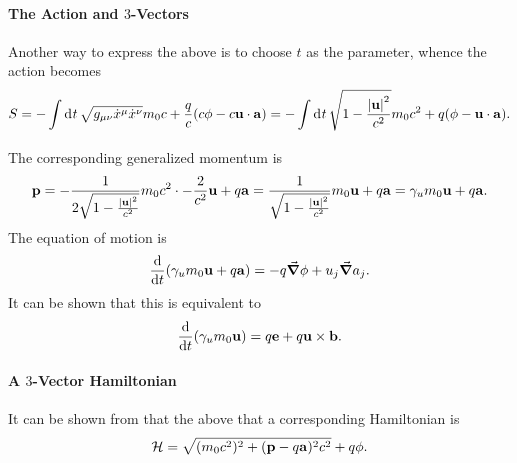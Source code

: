 \paragraph{The Action and $3$-Vectors}
Another way to express the above is to choose $t$ as the parameter, whence the action becomes
\begin{align*}
	S = -\int\limits_{}^{}\dd[]{t}\sqrt{g_{\mu\nu}\dot{x}^{\mu}\dot{x}^{\nu}}m_{0}c + \frac{q}{c}(c\phi - c\vb{u}\cdot\vb{a}) = -\int\limits_{}^{}\dd[]{t}\sqrt{1 - \frac{\abs{\vb{u}}^{2}}{c^{2}}}m_{0}c^{2} + q(\phi - \vb{u}\cdot\vb{a}).
\end{align*}
The corresponding generalized momentum is
\begin{align*}
	\vb{p} = -\frac{1}{2\sqrt{1 - \frac{\abs{\vb{u}}^{2}}{c^{2}}}}m_{0}c^{2}\cdot -\frac{2}{c^{2}}\vb{u} + q\vb{a} = \frac{1}{\sqrt{1 - \frac{\abs{\vb{u}}^{2}}{c^{2}}}}m_{0}\vb{u} + q\vb{a} = \gamma_{u}m_{0}\vb{u} + q\vb{a}.
\end{align*}
The equation of motion is
\begin{align*}
	\dv{t}(\gamma_{u}m_{0}\vb{u} + q\vb{a}) = -q\grad{\phi} + u_{j}\grad{a_{j}}.
\end{align*}
It can be shown that this is equivalent to
\begin{align*}
	\dv{t}(\gamma_{u}m_{0}\vb{u}) = q\vb{e} + q\vb{u}\times\vb{b}.
\end{align*}

\paragraph{A $3$-Vector Hamiltonian}
It can be shown from that the above that a corresponding Hamiltonian is
\begin{align*}
	\mathcal{H} = \sqrt{(m_{0}c^{2})^{2} + (\vb{p} - q\vb{a})^{2}c^{2}} + q\phi.
\end{align*}